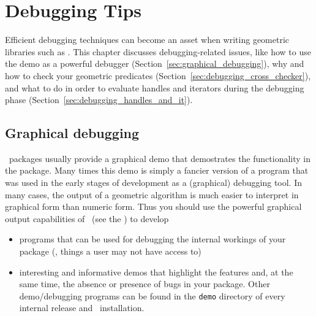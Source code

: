 
\chapter{Debugging Tips\label{chap:debugging}}


Efficient debugging techniques can become an asset when writing geometric 
libraries such as \cgal. 
This chapter discusses debugging-related issues, like how to use 
the demo as a powerful debugger (Section~\ref{sec:graphical_debugging}), 
why and how to check your geometric predicates 
(Section~\ref{sec:debugging_cross_checker}), and what 
to do in order to evaluate handles and iterators during the debugging phase
(Section~\ref{sec:debugging_handles_and_it}).

\section{Graphical debugging\label{sec:graphical_debugging}}

\cgal\ packages usually provide a graphical demo that demostrates the 
functionality in the package.  Many times this demo is simply a fancier
version of a program that was used in the early stages of development as a
(graphical) debugging tool.  In many cases, the output of a geometric
algorithm is much easier to interpret in graphical form than numeric
form.  Thus you should use the powerful graphical output capabilities
of \cgal\ (see the ) 
to develop 
\begin{itemize}
   \item programs that can be used for debugging the internal workings
         of your package (\ie, things a user may not have access to)
   \item interesting and informative demos that highlight the features and, 
         at the same time, the absence or presence of bugs in your package.  
         Other demo/debugging programs can be found in the \texttt{demo} 
         directory 
         of every internal release and \cgal\ installation.
\end{itemize}

